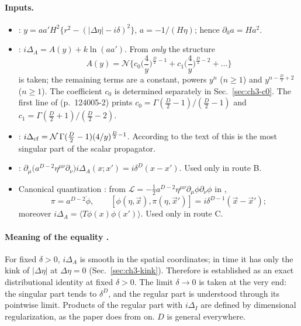 \paragraph{Inputs.}
\begin{itemize}[leftmargin=30pt,labelsep=5pt]
\item[(G1)]  \tP: $y=aa'H^2\{r^2-(|\Delta\eta|-i\delta)^2\}$, $a=-1/(H\eta)$; hence $\partial_0a=Ha^2$.
\item[(G2)]  \tP: $i\Delta_A=A(y)+k\ln(aa')$. From  \emph{only} the structure
\begin{equation}
A(y)=\mathcal N\Big\{c_0\Big(\frac4y\Big)^{\frac D2-1}+c_1\Big(\frac4y\Big)^{\frac D2-2}+\ldots\Big\}
\label{eq:ch3-Astruct}
\end{equation}
is taken; the remaining terms are a constant, powers $y^n$ ($n\ge1$) and $y^{n-\frac D2+2}$ ($n\ge1$). The coefficient $c_0$ is determined separately in Sec.~\ref{sec:ch3-c0}.
The first line of  (p.~124005-2) prints $c_0=\Gamma(\tfrac D2-1)/(\tfrac D2-1)$ and $c_1=\Gamma(\tfrac D2+1)/(\tfrac D2-2)$.
\item[(G3)]  \tP: $i\Delta_{\rm cf}=\mathcal N\,\Gamma(\tfrac D2-1)(4/y)^{\frac D2-1}$. According to the text of \PI{} this is the most singular part of the scalar propagator.
\item[(G4)]  \tP: $\partial_\mu\big(a^{D-2}\eta^{\mu\nu}\partial_\nu\big)i\Delta_A(x;x')=i\delta^D(x-x')$. Used only in route B.
\item[(G5)] Canonical quantization \tA: from $\mathcal L=-\tfrac12a^{D-2}\eta^{\mu\nu}\partial_\mu\phi\partial_\nu\phi$ in ,
\begin{equation*}
\pi=a^{D-2}\dot\phi,\qquad [\phi(\eta,\vec x),\pi(\eta,\vec x')]=i\delta^{D-1}(\vec x-\vec x');
\end{equation*}
moreover $i\Delta_A=\langle T\phi(x)\phi(x')\rangle$. Used only in route C.
\end{itemize}

\paragraph{Meaning of the equality \tA.}
For fixed $\delta>0$, $i\Delta_A$ is smooth in the spatial coordinates; in time it has only the kink of $|\Delta\eta|$ at $\Delta\eta=0$ (Sec.~\ref{sec:ch3-kink}).
Therefore  is established as an exact distributional identity at fixed $\delta>0$. The limit $\delta\to0$ is taken at the very end: the singular part tends to $\delta^D$,
and the regular part is understood through its pointwise limit. Products of the regular part with $i\Delta_I$ are defined by dimensional regularization, as the paper does from
 on. $D$ is general everywhere.

